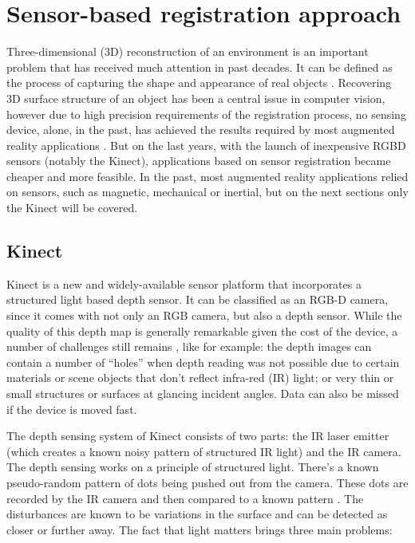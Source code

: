 \documentclass[msc, a4paper, classic, en]{ufbathesis}
\begin{document}
\section{Sensor-based registration approach}

Three-dimensional (3D) reconstruction of an environment is an important problem that has received much attention in past decades. It can be defined as the process of capturing the shape and appearance of real objects \cite{chandra20123}. Recovering 3D surface structure of an object has been a central issue in computer vision, however due to high precision requirements of the registration process, no sensing device, alone, in the past, has achieved the results required by most augmented reality applications \cite{vall98}. But on the last years, with the launch of inexpensive RGBD sensors (notably the Kinect), applications based on sensor registration became cheaper and more feasible. In the past, most augmented reality applications relied on sensors, such as magnetic, mechanical or inertial, but on the next sections only the Kinect will be covered.

\subsection{Kinect}
\label{sec:kinect}

Kinect \cite{kinect} is a new and widely-available sensor platform that incorporates a structured light based depth sensor. It can be classified as an RGB-D camera, since it comes with not only an RGB camera, but also a depth sensor. While the quality of this depth map is generally remarkable given the cost of the device, a number of challenges still remains \cite{kinfu2}, like for example: the depth images can contain a number of ``holes'' when depth reading was not possible due to certain materials or scene objects that don't reflect infra-red (IR) light; or very thin or small structures or surfaces at glancing incident angles. Data can also be missed if the device is moved fast.

The depth sensing system of Kinect consists of two parts: the IR laser emitter (which creates a known noisy pattern of structured IR light) and the IR camera. The depth sensing works on a principle of structured light. There's a known pseudo-random pattern of dots being pushed out from the camera. These dots are recorded by the IR camera and then compared to a known pattern \cite{hackingkinect}. The disturbances are known to be variations in the surface and can be detected as closer or further away. The fact that light matters brings three main problems:
\end{document}
